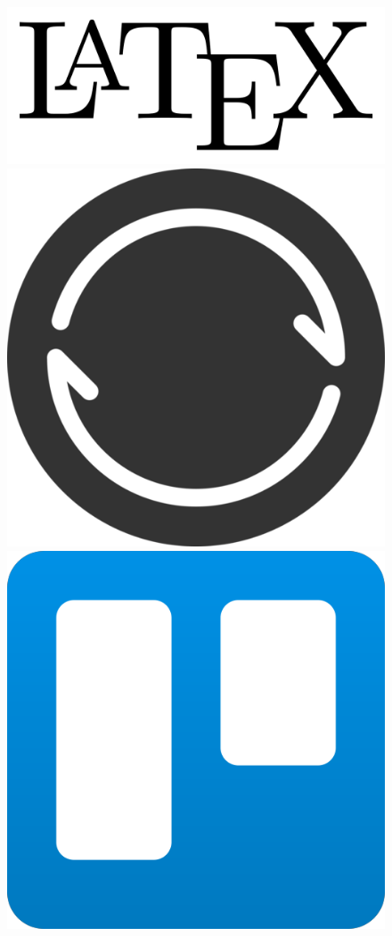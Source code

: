 \begin{figure}[ht]
  \includegraphics[height=\managementToolsLogosHeight]{assets/tools/management/latex.png}
  \includegraphics[height=\managementToolsLogosHeight]{assets/tools/development/resilio.png}
  \includegraphics[height=\managementToolsLogosHeight]{assets/tools/management/trello.png}

\end{figure}
